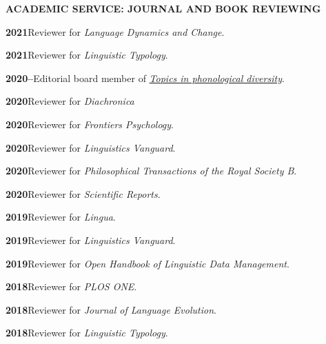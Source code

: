 \documentclass[11pt]{article}
\newcommand{\hangpara}{
 \setlength{\parindent}{0in} %
 \hangindent=0.42in %
}
\begin{document}
\vskip 20pt
\begin{flushleft}
{\bf ACADEMIC SERVICE: JOURNAL AND BOOK REVIEWING}
\end{flushleft}


\hangpara
{\bf 2021}\hspace{1ex}Reviewer for \textit{Language Dynamics and Change}.

\vskip 6pt
\hangpara
{\bf 2021}\hspace{1ex}Reviewer for \textit{Linguistic Typology}.

\vskip 6pt
\hangpara
{\bf 2020--}\hspace{1ex}Editorial board member of \textit{\href{https://langsci-press.org/catalog/series/tpd}{Topics in phonological diversity}}.

\vskip 6pt
\hangpara
{\bf 2020}\hspace{1ex}Reviewer for \textit{Diachronica}

\vskip 6pt
\hangpara
{\bf 2020}\hspace{1ex}Reviewer for \textit{Frontiers Psychology}.

\vskip 6pt
\hangpara
{\bf 2020}\hspace{1ex}Reviewer for \textit{Linguistics Vanguard}.

\vskip 6pt
\hangpara
{\bf 2020}\hspace{1ex}Reviewer for \textit{Philosophical Transactions of the Royal Society B}.

\vskip 6pt
\hangpara
{\bf 2020}\hspace{1ex}Reviewer for \textit{Scientific Reports}.

\vskip 6pt
\hangpara
{\bf 2019}\hspace{1ex}Reviewer for \textit{Lingua}.

\vskip 6pt
\hangpara
{\bf 2019}\hspace{1ex}Reviewer for \textit{Linguistics Vanguard}.

\vskip 6pt
\hangpara
{\bf 2019}\hspace{1ex}Reviewer for \textit{Open Handbook of Linguistic Data Management}.

\vskip 6pt
\hangpara
{\bf 2018}\hspace{1ex}Reviewer for \textit{PLOS ONE}.

\vskip 6pt
\hangpara
{\bf 2018}\hspace{1ex}Reviewer for \textit{Journal of Language Evolution}.

\vskip 6pt
\hangpara
{\bf 2018}\hspace{1ex}Reviewer for \textit{Linguistic Typology}.
\end{document}
